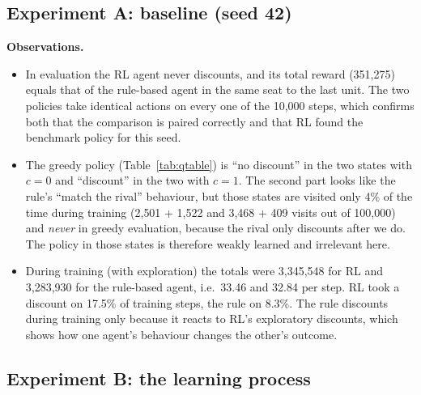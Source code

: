 \documentclass[11pt, a4paper]{article}
\newcommand{\restable}[1]{}
\begin{document}
\subsection{Experiment A: baseline (seed 42)}

\begin{table}[H]
\centering
\caption{Separate greedy evaluation of the baseline agents: 500 episodes, 10{,}000 steps, evaluation seed 42 + 500{,}000.}
\label{tab:baseline}
\resizebox{\textwidth}{!}{\restable{baseline_eval.tex}}
\end{table}

\begin{table}[H]
\centering
\caption{Learned Q-table of the baseline RL agent after 5{,}000 training episodes (seed 42). Visits are counted over the whole training run.}
\label{tab:qtable}
\restable{baseline_qtable.tex}
\end{table}

\textbf{Observations.}
\begin{itemize}
    \item In evaluation the RL agent never discounts, and its total reward (351{,}275) equals that of the rule-based agent in the same seat to the last unit. The two policies take identical actions on every one of the 10{,}000 steps, which confirms both that the comparison is paired correctly and that RL found the benchmark policy for this seed.
    \item The greedy policy (Table~\ref{tab:qtable}) is ``no discount'' in the two states with $c = 0$ and ``discount'' in the two with $c = 1$. The second part looks like the rule's ``match the rival'' behaviour, but those states are visited only 4\% of the time during training (2{,}501 + 1{,}522 and 3{,}468 + 409 visits out of 100{,}000) and \emph{never} in greedy evaluation, because the rival only discounts after we do. The policy in those states is therefore weakly learned and irrelevant here.
    \item During training (with exploration) the totals were 3{,}345{,}548 for RL and 3{,}283{,}930 for the rule-based agent, i.e.\ 33.46 and 32.84 per step. RL took a discount on 17.5\% of training steps, the rule on 8.3\%. The rule discounts during training only because it reacts to RL's exploratory discounts, which shows how one agent's behaviour changes the other's outcome.
\end{itemize}

\subsection{Experiment B: the learning process}
\end{document}
